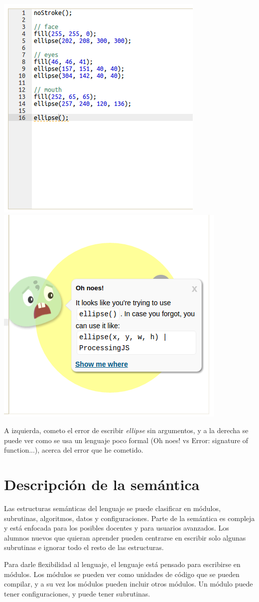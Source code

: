 \documentclass{report}
\begin{document}
	\begin{center}
	\includegraphics[width=0.45\linewidth]{khanerror}
	\includegraphics[width=0.45\linewidth]{khanerror2}
	
	A izquierda, cometo el error de escribir \textit{ellipse} sin argumentos, y a la derecha se puede ver como se usa un lenguaje poco formal (Oh noes! vs Error: signature of function...), acerca del error que he cometido.
	\end{center}

	
	\chapter{Descripción de la semántica}
	
	
	Las estructuras semánticas del lenguaje se puede clasificar en módulos, subrutinas, algoritmos, datos y configuraciones. Parte de la semántica es compleja y está enfocada para los posibles docentes y para usuarios avanzados. Los alumnos nuevos que quieran aprender pueden centrarse en escribir solo algunas subrutinas e ignorar todo el resto de las estructuras.
	
	\vspace{10px}
	
	Para darle flexibilidad al lenguaje, el lenguaje está pensado para escribirse en módulos. Los módulos se pueden ver como unidades de código que se pueden compilar, y a su vez los módulos pueden incluir otros módulos. Un módulo puede tener configuraciones, y puede tener subrutinas. 
	
\end{document}
